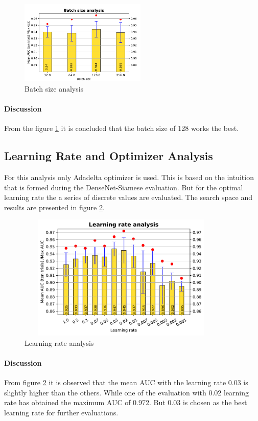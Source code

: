 \begin{figure}[ht]
\centering
\includegraphics[width=6cm]{images/densenet/simple/densenet_simple_batchsize}
\caption{Batch size analysis}
\label{fig:densenet_simple_batchsize}
\end{figure}
 
\paragraph{Discussion\\}
From the figure \ref{fig:densenet_simple_batchsize} it is concluded that the batch size of 128 works the best. 

\subsection{Learning Rate and Optimizer Analysis}
For this analysis only Adadelta optimizer is used. This is based on the intuition that is formed during the DenseNet-Siamese evaluation.
But for the optimal learning rate the a series of discrete values are evaluated. The search space and results are presented in figure \ref{fig:densenet_simple_learning_rate}.
\begin{figure}[ht]
\centering
\includegraphics[width=10cm,height=6cm]{images/densenet/simple/densenet_simple_learning_rate}
\caption{Learning rate analysis}
\label{fig:densenet_simple_learning_rate}
\end{figure}

\paragraph{Discussion\\} 
From figure \ref{fig:densenet_simple_learning_rate} it is observed that the mean AUC with the learning rate 0.03 is slightly higher than the others. While one of the evaluation with 0.02 learning rate has 
obtained the maximum AUC of 0.972. But 0.03 is chosen as the best learning rate for further evaluations.


